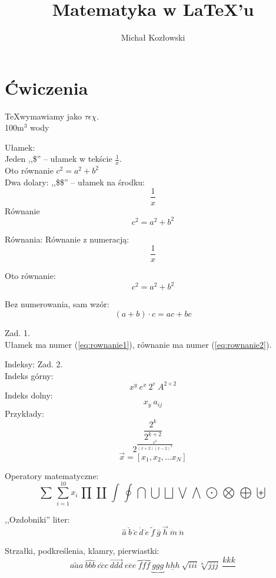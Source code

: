 ﻿\documentclass[a4paper,12pt]{article}
\title{Matematyka w LaTeX'u}
\author{Michał Kozłowski}
\begin{document}
\maketitle

\section{Ćwiczenia}

\TeX wymawiamy jako $\tau\epsilon\chi$.\\
100m$^3$ wody

Ułamek:\\
Jeden ,,\$'' -- ułamek w tekście $ \frac{1}{x} $.\\
Oto równanie $c^{2} = a^{2}+b^{2}$\\

Dwa dolary: ,,\$\$'' -- ułamek na środku: $$ \frac{1}{x} $$
Równanie $$c^{2} = a^{2}+b^{2}$$

Równania:
Równanie z numeracją:
\begin{equation}
\frac{1}{x}
\label{eq:rownanie1}
\end{equation}

Oto równanie:
\begin{equation}
c^{2}=a^{2}+b^{2}
\label{eq:rownanie2}
\end{equation}

Bez numerowania, sam wzór:
\begin{displaymath}
	(a+b)\cdot c=ac+bc
\end{displaymath}

Zad. 1.\\
Ułamek ma numer (\ref{eq:rownanie1}), równanie ma numer
(\ref{eq:rownanie2}).

Indeksy:
Zad. 2.\\
Indeks górny:
$$ x^y \ e^{x} \ 2^{e} \ A^{2 \times 2} $$
Indeks dolny:
$$ x_y \ a_{ij} $$
Przykłady:
$$ \frac{2^k}{2^{k+2}} $$
$$ 2^\frac{x^2}{(x+2)(x-2)^3}	$$
$$ \vec{x} = [x_1,x_2, \dots x_N]	$$

Operatory matematyczne:
$$ \sum \ \sum_{i=1}^{10}x_{i} \ \prod \ \coprod \ \int \ \oint \ \bigcap \ \bigcup \
	\bigsqcup \ \bigvee \ \bigwedge \ \bigodot \ \bigotimes \ \bigoplus \ \biguplus $$
	
,,Ozdobniki'' liter:\\
$$ \hat{a} \ \check{b} \ \breve{c} \ \acute{d} \ \grave{e} \ \tilde{f} \ \bar{g} \ 
	\vec{h} \ \dot{m} \ \ddot{n}$$
	
Strzałki, podkreślenia, klamry, pierwiastki:\\
$$ \widetilde{aaa} \ \widehat{bbb} \ \overleftarrow{ccc} \ \overrightarrow{ddd} \
	\overline{eee} \ \overbrace{fff} \ \underbrace{ggg} \ \underline{hhh} \
	\sqrt{iii} \sqrt[n]{jjj} \ \frac{kkk}{}$$
\end{document}
